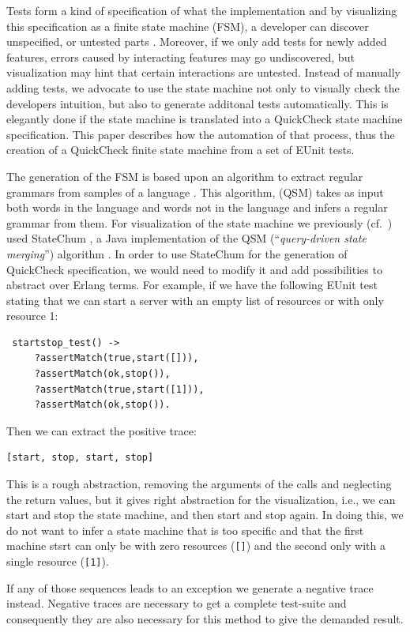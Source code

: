 \documentclass[]{sigplanconf}
\begin{document}
Tests form a kind of specification of what the implementation and by visualizing this specification as a finite state machine (FSM), a developer can discover unspecified, or untested parts  \cite{arts2010test}. Moreover, if we only add tests for newly added features, errors caused by interacting features may go undiscovered, but visualization may hint that certain interactions are untested. Instead of manually adding tests, we advocate to use the state machine not only to visually check the developers intuition, but also to generate additonal tests automatically. This is elegantly done if the state machine is translated into a QuickCheck state machine specification.
This paper describes how the automation of that process, thus the creation of a QuickCheck finite state machine from a set of EUnit tests.  

The generation of the FSM is based upon an algorithm to extract regular grammars from samples of a language \cite{dupont2008qsm}.
This algorithm, (QSM) takes as input both words in the language and words not in the
language and infers a regular grammar from them. For visualization of the state machine we previously  (cf.\ \cite{arts2010test}) used StateChum \cite{statechum}, a Java implementation of the QSM (``\emph{query-driven state merging}'') algorithm \cite{dupont2008qsm}. In order to use StateChum for the generation of QuickCheck specification, we would need to modify it and add possibilities to abstract over Erlang terms. 
For example, if we have the following EUnit test stating that we can start a server with an empty list of resources or with only resource 1:
\begin{verbatim}
 startstop_test() ->
     ?assertMatch(true,start([])),
     ?assertMatch(ok,stop()),
     ?assertMatch(true,start([1])),
     ?assertMatch(ok,stop()).
\end{verbatim}
Then we can extract the positive trace: 
\begin{verbatim}
[start, stop, start, stop]
\end{verbatim}
This is a rough abstraction, removing the arguments of the calls and neglecting the return values, but it gives right abstraction for the visualization, i.e., we can start and stop the state machine, and then start and stop again. In doing this, we do not want to infer a state machine that is too specific and that the first machine stsrt can only be with zero resources (\verb+[]+) and the second only with a single resource (\verb+[1]+). 

If any of those sequences leads to an exception we generate a negative trace instead.
Negative traces are necessary to get a complete test-suite and consequently they are
also necessary for this method to give the demanded result.
\end{document}
